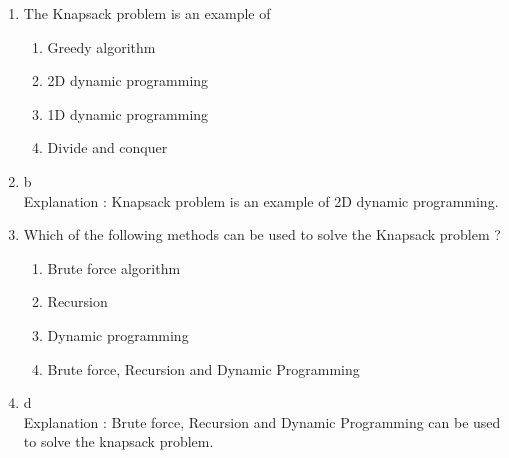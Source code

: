 ﻿\documentclass{article}
\newcommand{\answer}{\item [$\rightarrow$]}
\begin{document}
\begin{enumerate}
		\item The Knapsack problem is an example of \underline{\hspace{5em}}
		\begin{enumerate}[label=\alph*) ]
			\item Greedy algorithm
			\item 2D dynamic programming
			\item 1D dynamic programming
			\item Divide and conquer
		\end{enumerate}
		\answer b \\
		Explanation : Knapsack problem is an example of 2D dynamic programming.
		
		\item Which of the following methods can be used to solve the Knapsack problem ?
		\begin{enumerate}[label=\alph*) ]
			\item Brute force algorithm
			\item Recursion
			\item Dynamic programming
			\item Brute force, Recursion and Dynamic Programming
		\end{enumerate}
		\answer d \\
		Explanation : Brute force, Recursion and Dynamic Programming can be used to solve the knapsack problem.
	\end{enumerate} \newpage
		
\end{document}
